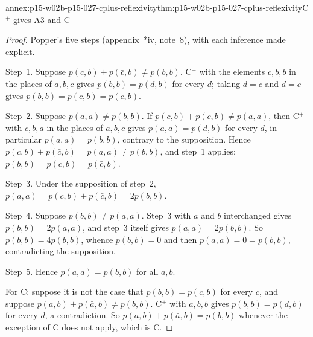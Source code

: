 \begin{annexitem}{annex:p15-w02b-p15-027-cplus-reflexivity}{thm:p15-w02b-p15-027-cplus-reflexivity}{C\texorpdfstring{\({}^{+}\)}{+} gives A3 and C}
\begin{proof}
Popper's five steps (appendix~*iv, note~8), with each inference made
explicit.

Step~1. Suppose \(p(c,b)+p(\bar c,b)\neq p(b,b)\). C\({}^{+}\) with the
elements \(c,b,b\) in the places of \(a,b,c\) gives \(p(b,b)=p(d,b)\) for
every \(d\); taking \(d=c\) and \(d=\bar c\) gives
\(p(b,b)=p(c,b)=p(\bar c,b)\).

Step~2. Suppose \(p(a,a)\neq p(b,b)\). If
\(p(c,b)+p(\bar c,b)\neq p(a,a)\), then C\({}^{+}\) with \(c,b,a\) in the
places of \(a,b,c\) gives \(p(a,a)=p(d,b)\) for every \(d\), in particular
\(p(a,a)=p(b,b)\), contrary to the supposition. Hence
\(p(c,b)+p(\bar c,b)=p(a,a)\neq p(b,b)\), and step~1 applies:
\(p(b,b)=p(c,b)=p(\bar c,b)\).

Step~3. Under the supposition of step~2,
\(p(a,a)=p(c,b)+p(\bar c,b)=2p(b,b)\).

Step~4. Suppose \(p(b,b)\neq p(a,a)\). Step~3 with \(a\) and \(b\)
interchanged gives \(p(b,b)=2p(a,a)\), and step~3 itself gives
\(p(a,a)=2p(b,b)\). So \(p(b,b)=4p(b,b)\), whence \(p(b,b)=0\) and then
\(p(a,a)=0=p(b,b)\), contradicting the supposition.

Step~5. Hence \(p(a,a)=p(b,b)\) for all \(a,b\).

For C: suppose it is not the case that \(p(b,b)=p(c,b)\) for every \(c\),
and suppose \(p(a,b)+p(\bar a,b)\neq p(b,b)\). C\({}^{+}\) with \(a,b,b\)
gives \(p(b,b)=p(d,b)\) for every \(d\), a contradiction. So
\(p(a,b)+p(\bar a,b)=p(b,b)\) whenever the exception of C does not apply,
which is C.
\end{proof}
\end{annexitem}

